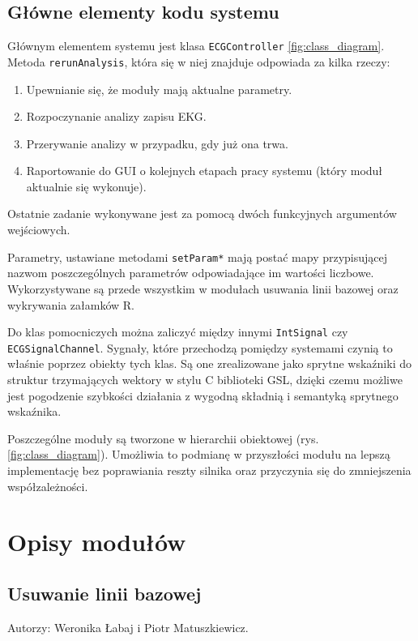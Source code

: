 \documentclass[a4paper, 11pt]{article}
\begin{document}
\subsection{Główne elementy kodu systemu}

Głównym elementem systemu jest klasa \verb+ECGController+ \ref{fig:class_diagram}. Metoda \verb+rerunAnalysis+, która się w niej znajduje odpowiada za kilka rzeczy:
\begin{enumerate}
\item Upewnianie się, że moduły mają aktualne parametry.
\item Rozpoczynanie analizy zapisu EKG.
\item Przerywanie analizy w przypadku, gdy już ona trwa.
\item Raportowanie do GUI o kolejnych etapach pracy systemu (który moduł aktualnie się wykonuje).
\end{enumerate}
Ostatnie zadanie wykonywane jest za pomocą dwóch funkcyjnych argumentów wejściowych.

Parametry, ustawiane metodami \verb+setParam*+ mają postać mapy przypisującej nazwom poszczególnych parametrów odpowiadające im wartości liczbowe. Wykorzystywane są przede wszystkim w modułach usuwania linii bazowej oraz wykrywania załamków R.

Do klas pomocniczych można zaliczyć między innymi \verb+IntSignal+ czy \verb+ECGSignalChannel+. Sygnały, które przechodzą pomiędzy systemami czynią to właśnie poprzez obiekty tych klas. Są one zrealizowane jako sprytne wskaźniki do struktur trzymających wektory w stylu C biblioteki GSL, dzięki czemu możliwe jest pogodzenie szybkości działania z wygodną składnią i semantyką sprytnego wskaźnika.

Poszczególne moduły są tworzone w hierarchii obiektowej (rys. \ref{fig:class_diagram}). Umożliwia to podmianę w przyszłości modułu na lepszą implementację bez poprawiania reszty silnika oraz przyczynia się do zmniejszenia współzależności.

\section{Opisy modułów}
\label{sec:mod}

\subsection{Usuwanie linii bazowej}
\label{sec:baseline}
Autorzy: Weronika Łabaj i Piotr Matuszkiewicz.
\end{document}

